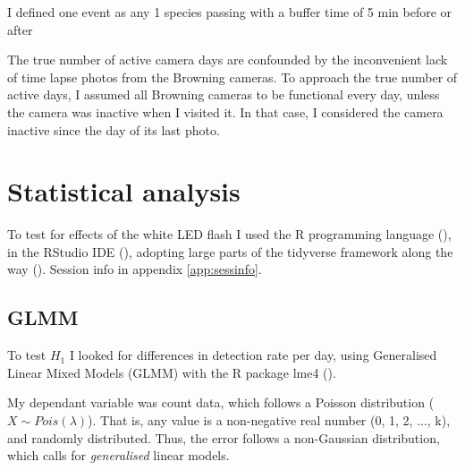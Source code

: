 I defined one event as any 1 species passing with a buffer time of 5 min before or after %


The true number of active camera days are confounded by the inconvenient lack of time lapse photos from the Browning cameras. To approach the true number of active days, I assumed all Browning cameras to be functional every day, unless the camera was inactive when I visited it. In that case, I considered the camera inactive since the day of its last photo.



%
%
%
%
%


\section{Statistical analysis} %

To test for effects of the white LED flash I used the R programming language (\cite{RCoreTeam2020}), in the RStudio IDE (\cite{RStudioTeam2020a}), adopting large parts of the tidyverse framework along the way (\cite{tidyverse}). Session info in appendix \ref{app:sessinfo}. %



	\subsection*{GLMM}
To test $H_{1}$ I looked for differences in detection rate per day, using Generalised Linear Mixed Models (GLMM) with the R package lme4 (\cite{lme4}).

My dependant variable was count data, which follows a Poisson distribution ($ X \sim Pois(\lambda) $). That is, any value is a non-negative real number (0, 1, 2, ..., k), and randomly distributed.
Thus, the error follows a non-Gaussian distribution, which calls for \emph{generalised} linear models. 

